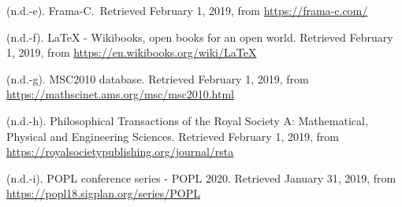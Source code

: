 \documentclass[12pt,twoside]{article}
\begin{document}
{\begin{thebibliography}{222}
\mdbibitemlabel{}(n.d.-e). Frama-C.~Retrieved February 1, 2019, from \href{https://frama-c.com/}{{\ttfamily https://\hspace{0pt}frama-\hspace{0pt}c.\hspace{0pt}com/\hspace{0pt}}}\label{cea_frama-c_nodate}%

\mdbibitemlabel{}(n.d.-f). LaTeX - Wikibooks, open books for an open world. Retrieved February 1, 2019, from \href{https://en.wikibooks.org/wiki/LaTeX}{{\ttfamily https://\hspace{0pt}en.\hspace{0pt}wikibooks.\hspace{0pt}org/\hspace{0pt}wiki/\hspace{0pt}LaTeX}}\label{wikibook_latex_nodate}%

\mdbibitemlabel{}(n.d.-g). MSC2010 database. Retrieved February 1, 2019, from \href{https://mathscinet.ams.org/msc/msc2010.html}{{\ttfamily https://\hspace{0pt}mathscinet.\hspace{0pt}ams.\hspace{0pt}org/\hspace{0pt}msc/\hspace{0pt}msc2010.\hspace{0pt}html}}\label{acm_msc2010_nodate}%

\mdbibitemlabel{}(n.d.-h). Philosophical Transactions of the Royal Society A: Mathematical, Physical and Engineering Sciences. Retrieved February 1, 2019, from \href{https://royalsocietypublishing.org/journal/rsta}{{\ttfamily https://\hspace{0pt}royalsocietypublishing.\hspace{0pt}org/\hspace{0pt}journal/\hspace{0pt}rsta}}\label{royalsociety_philosophical_nodate}%

\mdbibitemlabel{}(n.d.-i). POPL conference series - POPL 2020. Retrieved January 31, 2019, from \href{https://popl18.sigplan.org/series/POPL}{{\ttfamily https://\hspace{0pt}popl18.\hspace{0pt}sigplan.\hspace{0pt}org/\hspace{0pt}series/\hspace{0pt}POPL}}\label{acm_popl_nodate}%


\end{thebibliography}}
\end{document}
